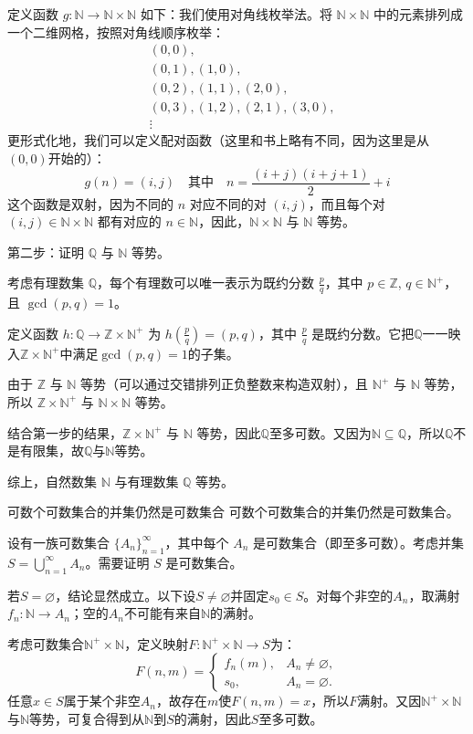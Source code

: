 \documentclass[lang=cn,11pt]{elegantbook}
\begin{document}
定义函数 $g: \mathbb{N} \to \mathbb{N} \times \mathbb{N}$ 如下：我们使用对角线枚举法。将 $\mathbb{N} \times \mathbb{N}$ 中的元素排列成一个二维网格，按照对角线顺序枚举：
\begin{align*}
&(0,0), \\
&(0,1), (1,0), \\
&(0,2), (1,1), (2,0), \\
&(0,3), (1,2), (2,1), (3,0), \\
&\vdots
\end{align*}
更形式化地，我们可以定义配对函数（这里和书上略有不同，因为这里是从$(0,0)$开始的）：
\[
g(n) = (i,j) \quad \text{其中} \quad n = \frac{(i+j)(i+j+1)}{2} + i
\]
这个函数是双射，因为不同的 $n$ 对应不同的对 $(i,j)$，而且每个对 $(i,j) \in \mathbb{N} \times \mathbb{N}$ 都有对应的 $n \in \mathbb{N}$，因此，$\mathbb{N} \times \mathbb{N}$ 与 $\mathbb{N}$ 等势。

第二步：证明 $\mathbb{Q}$ 与 $\mathbb{N}$ 等势。

考虑有理数集 $\mathbb{Q}$，每个有理数可以唯一表示为既约分数 $\frac{p}{q}$，其中 $p \in \mathbb{Z}$, $q \in \mathbb{N}^+$，且 $\gcd(p,q) = 1$。

定义函数 $h: \mathbb{Q} \to \mathbb{Z} \times \mathbb{N}^+$ 为 $h\left(\frac{p}{q}\right) = (p,q)$，其中 $\frac{p}{q}$ 是既约分数。它把$\mathbb{Q}$一一映入$\mathbb{Z} \times \mathbb{N}^+$中满足$\gcd(p,q)=1$的子集。

由于 $\mathbb{Z}$ 与 $\mathbb{N}$ 等势（可以通过交错排列正负整数来构造双射），且 $\mathbb{N}^+$ 与 $\mathbb{N}$ 等势，所以 $\mathbb{Z} \times \mathbb{N}^+$ 与 $\mathbb{N} \times \mathbb{N}$ 等势。

结合第一步的结果，$\mathbb{Z} \times \mathbb{N}^+$ 与 $\mathbb{N}$ 等势，因此$\mathbb{Q}$至多可数。又因为$\mathbb{N}\subseteq\mathbb{Q}$，所以$\mathbb{Q}$不是有限集，故$\mathbb{Q}$与$\mathbb{N}$等势。

综上，自然数集 $\mathbb{N}$ 与有理数集 $\mathbb{Q}$ 等势。
\begin{theorem}{可数个可数集合的并集仍然是可数集合}
    可数个可数集合的并集仍然是可数集合。
    
    设有一族可数集合 $\{A_n\}_{n=1}^\infty$，其中每个 $A_n$ 是可数集合（即至多可数）。考虑并集 $S = \bigcup_{n=1}^\infty A_n$。需要证明 $S$ 是可数集合。
\end{theorem}
若$S=\varnothing$，结论显然成立。以下设$S\ne\varnothing$并固定$s_0\in S$。对每个非空的$A_n$，取满射$f_n:\mathbb N\to A_n$；空的$A_n$不可能有来自$\mathbb N$的满射。

考虑可数集合$\mathbb N^+\times\mathbb N$，定义映射$F:\mathbb N^+\times\mathbb N\to S$为：
\[
F(n,m)=\begin{cases}f_n(m),&A_n\ne\varnothing,\\s_0,&A_n=\varnothing.\end{cases}
\]
任意$x\in S$属于某个非空$A_n$，故存在$m$使$F(n,m)=x$，所以$F$满射。又因$\mathbb N^+\times\mathbb N$与$\mathbb N$等势，可复合得到从$\mathbb N$到$S$的满射，因此$S$至多可数。
\end{document}
